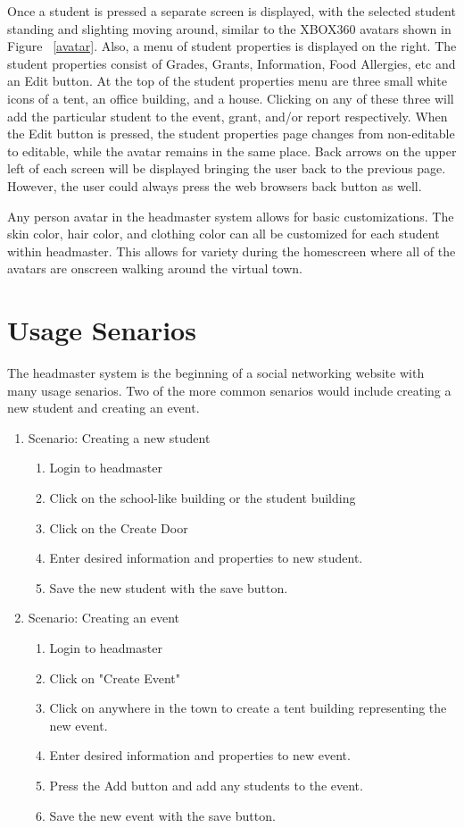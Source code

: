 \documentclass[11pt]{article}
\begin{document}
Once a student is pressed a separate screen is displayed, with the selected student standing and slighting moving around, similar to the XBOX360 avatars shown in Figure ~\ref{avatar}. Also, a menu of student properties is displayed on the right. The student properties consist of Grades, Grants, Information, Food Allergies, etc and an Edit button. At the top of the student properties menu are three small white icons of a tent, an office building, and a house. Clicking on any of these three will add the particular student to the event, grant, and/or report respectively. When the Edit button is pressed, the student properties page changes from non-editable to editable, while the avatar remains in the same place. Back arrows on the upper left of each screen will be displayed bringing the user back to the previous page. However, the user could always press the web browsers back button as well.

Any person avatar in the headmaster system allows for basic customizations. The skin color, hair color, and clothing color can all be customized for each student within headmaster. This allows for variety during the homescreen where all of the avatars are onscreen walking around the virtual town.

\section{Usage Senarios}
The headmaster system is the beginning of a social networking website with many usage senarios. Two of the more common senarios would include creating a new student and creating an event.
\begin{enumerate}
    \item Scenario: Creating a new student
  \begin{enumerate}
        \item Login to headmaster
        \item Click on the school-like building or the student building
        \item Click on the Create Door
        \item Enter desired information and properties to new student.
        \item Save the new student with the save button.
  \end{enumerate}
    \item Scenario: Creating an event
  \begin{enumerate}
        \item Login to headmaster
        \item Click on "Create Event"
        \item Click on anywhere in the town to create a tent building representing the new event.
        \item Enter desired information and properties to new event.
        \item Press the Add button and add any students to the event.
        \item Save the new event with the save button.
  \end{enumerate}
\end{enumerate}
\end{document}
